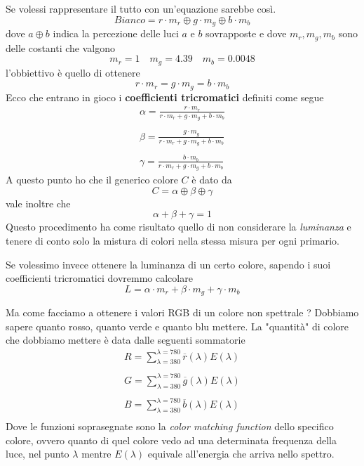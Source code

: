 Se volessi rappresentare il tutto con un'equazione sarebbe cos\`i.
\[ Bianco = r \cdot m_r \oplus g \cdot m_g \oplus b \cdot m_b \]
dove $a \oplus b$ indica la percezione delle luci $a$ e $b$ sovrapposte e dove
$m_r, m_g, m_b$ sono delle costanti che valgono
\[ m_r = 1 \quad m_g = 4.39 \quad m_b = 0.0048 \]
l'obbiettivo \`e quello di ottenere
\[ r \cdot m_r = g \cdot m_g = b \cdot m_b \]
Ecco che entrano in gioco i \textbf{coefficienti tricromatici} definiti come segue
\begin{gather*}
	\alpha = \frac{r \cdot m_r}{r \cdot m_r + g \cdot m_g + b \cdot m_b} \\
	\\
	\beta = \frac{g \cdot m_g}{r \cdot m_r + g \cdot m_g + b \cdot m_b} \\
	\\
	\gamma = \frac{b \cdot m_b}{r \cdot m_r + g \cdot m_g + b \cdot m_b}
\end{gather*}
A questo punto ho che il generico colore $C$ \`e dato da
\[ C = \alpha \oplus \beta \oplus \gamma \]
vale inoltre che
\[ \alpha + \beta + \gamma = 1 \]
Questo procedimento ha come risultato quello di non considerare la \emph{luminanza} e tenere
di conto solo la mistura di colori nella stessa misura per ogni primario.

Se volessimo invece ottenere la luminanza di un certo colore, sapendo i suoi coefficienti
tricromatici dovremmo calcolare
\[ L = \alpha \cdot m_r + \beta \cdot m_g + \gamma \cdot m_b \]

Ma come facciamo a ottenere i valori RGB di un colore non spettrale ?
Dobbiamo sapere quanto rosso, quanto verde e quanto blu mettere. La "quantit\`a" di colore che
dobbiamo mettere \`e data dalle seguenti sommatorie
\begin{gather*}
	R = \sum_{\lambda = 380}^{\lambda = 780} \overline{r}(\lambda) E(\lambda) \\
	\\
	G = \sum_{\lambda = 380}^{\lambda = 780} \overline{g}(\lambda) E(\lambda) \\
	\\
	B = \sum_{\lambda = 380}^{\lambda = 780} \overline{b}(\lambda) E(\lambda) \\
\end{gather*}
Dove le funzioni soprasegnate sono la \emph{color matching function} dello specifico colore,
ovvero quanto di quel colore vedo ad una determinata frequenza della luce, nel punto
$\lambda$ mentre $E(\lambda)$ equivale all'energia che arriva nello spettro.

